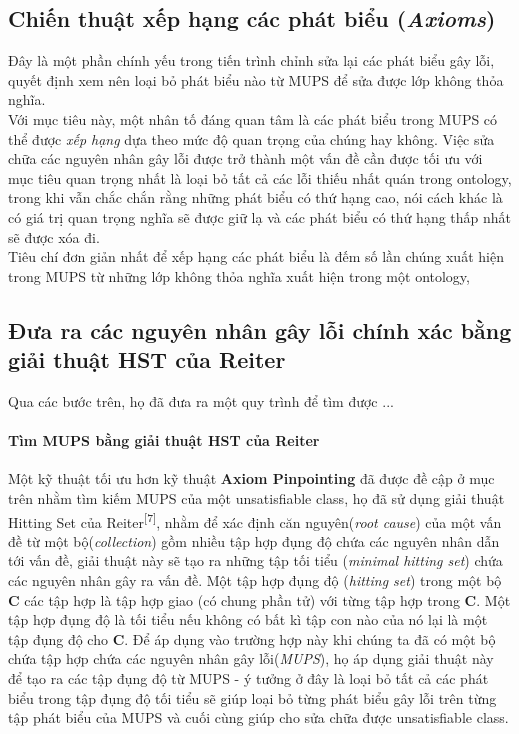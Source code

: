 \subsection{Chiến thuật xếp hạng các phát biểu (\textit{Axioms})}
Đây là một phần chính yếu trong tiến trình chỉnh sửa lại các phát biểu gây lỗi, quyết định xem nên loại bỏ phát biểu nào từ MUPS để sửa được lớp không thỏa nghĩa.
\\
\hspace{.05\textwidth} Với mục tiêu này, một nhân tố đáng quan tâm là các phát biểu trong MUPS có thể được \textit{xếp hạng} dựa theo mức độ quan trọng của chúng hay không. Việc sửa chữa các nguyên nhân gây lỗi được trở thành một vấn đề cần được tối ưu với mục tiêu quan trọng nhất là loại bỏ tất cả các lỗi thiếu nhất quán trong ontology, trong khi vẫn chắc chắn rằng những phát biểu có thứ hạng cao, nói cách khác là có giá trị quan trọng nghĩa sẽ được giữ lạ và các phát biểu có thứ hạng thấp nhất sẽ được xóa đi.
\\
\hspace{.05\textwidth} Tiêu chí đơn giản nhất để xếp hạng các phát biểu là đếm số lần chúng xuất hiện trong MUPS từ những lớp không thỏa nghĩa xuất hiện trong một ontology,
\subsection{Đưa ra các nguyên nhân gây lỗi chính xác bằng giải thuật HST của Reiter}
Qua các bước trên, họ đã đưa ra một quy trình để tìm được ...

\paragraph{Tìm MUPS bằng giải thuật HST của Reiter}
Một kỹ thuật tối ưu hơn kỹ thuật \textbf{Axiom Pinpointing} đã được đề cập ở mục trên nhằm tìm kiếm MUPS của một unsatisfiable class, họ đã sử dụng giải thuật Hitting Set của Reiter\textsuperscript{[7]}, nhằm để xác định căn nguyên(\textit{root cause}) của một vấn đề từ một bộ(\textit{collection}) gồm nhiều tập hợp đụng độ chứa các nguyên nhân dẫn tới vấn đề, giải thuật này sẽ tạo ra những tập tối tiểu (\textit{minimal hitting set}) chứa các nguyên nhân gây ra vấn đề. Một tập hợp đụng độ (\textit{hitting set}) trong một bộ \textbf{C} các tập hợp là tập hợp giao (có chung phần tử) với từng tập hợp trong \textbf{C}. Một tập hợp đụng độ là tối tiểu nếu không có bất kì tập con nào của nó lại là một tập đụng độ cho \textbf{C}. Để áp dụng vào trường hợp này khi chúng ta đã có một bộ chứa tập hợp chứa các nguyên nhân gây lỗi(\textit{MUPS}), họ áp dụng giải thuật này để tạo ra các tập đụng độ từ MUPS - ý tưởng ở đây là loại bỏ tất cả các phát biểu trong tập đụng độ tối tiểu sẽ giúp loại bỏ từng phát biểu gây lỗi trên từng tập phát biểu của MUPS và cuối cùng giúp cho sửa chữa được unsatisfiable class.		
